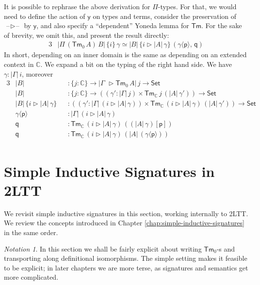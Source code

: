 \documentclass[12pt,a4paper,twoside,openany]{book}
\theoremstyle{remark}
\newtheorem{notation}{Notation}
\theoremstyle{definition}
\theoremstyle{theorem}
\newcommand{\ms}[1]{\mathsf{#1}}
\newcommand{\mbb}[1]{\mathbb{#1}}
\newcommand{\Tm}{\mathsf{Tm}}
\newcommand{\blank}{\mathord{\hspace{1pt}\text{--}\hspace{1pt}}}
\newcommand{\Set}{\mathsf{Set}}
\newcommand{\ext}{\triangleright}
\newcommand{\p}{\mathsf{p}}
\newcommand{\q}{\mathsf{q}}
\newcommand{\mbbC}{\mbb{C}}
\newcommand{\lab}{\langle}
\newcommand{\rab}{\rangle}
\newcommand{\yon}{\ms{y}}
\begin{document}
It is possible to rephrase the above derivation for $\Pi$-types. For that, we
would need to define the action of $\yon$ on types and terms, consider the
preservation of $\blank\ext\blank$ by $\yon$, and also specify a ``dependent''
Yoneda lemma for $\Tm$. For the sake of brevity, we omit this, and present the
result directly:
\begin{alignat*}{3}
  & |\Pi\,(\Tm_0\,A)\,B|\,\{i\}\,\gamma \simeq |B|\,\{i \ext |A|\,\gamma\}\,(\gamma \lab \p \rab,\,\q)
\end{alignat*}
In short, depending on an inner domain is the same as depending on an extended
context in $\mbbC$.  We expand a bit on the typing of the right hand side. We
have $\gamma : |\Gamma|\,i$, moreover
\begingroup
\allowdisplaybreaks
\begin{alignat*}{3}
  & |B| &&: \{j : \mbbC\} \to |\Gamma\,\,\ext \Tm_0\,A|\,j \to \Set\\
  & |B| &&: \{j : \mbbC\} \to ((\gamma' : |\Gamma|\,j)\times \Tm_{\mbbC}\,j\,(|A|\,\gamma')) \to \Set\\
  & |B|\,\{i \ext |A|\,\gamma\} &&: ((\gamma' : |\Gamma|\,(i \ext |A|\,\gamma))\times \Tm_{\mbbC}\,(i \ext |A|\,\gamma)\,(|A|\,\gamma')) \to \Set\\
  & \gamma \lab \p \rab &&: |\Gamma|\,(i \ext |A|\,\gamma)\\
  & \q &&: \Tm_{\mbbC}\,(i \ext |A|\,\gamma)\,((|A|\,\gamma)[\p])\\
  & \q &&: \Tm_{\mbbC}\,(i \ext |A|\,\gamma)\,(|A|\,(\gamma \lab \p \rab))\\
\end{alignat*}
\endgroup

\section{Simple Inductive Signatures in 2LTT}
\label{sec:2ltt-simple-signatures}

We revisit simple inductive signatures in this section, working internally to
2LTT. We review the concepts introduced in Chapter
\ref{chap:simple-inductive-signatures} in the same order.

\begin{notation}
In this section we shall be fairly explicit about writing $\Tm_0$-s and
transporting along definitional isomorphisms. The simple setting makes it
feasible to be explicit; in later chapters we are more terse, as signatures and
semantics get more complicated.
\end{notation}
\end{document}
